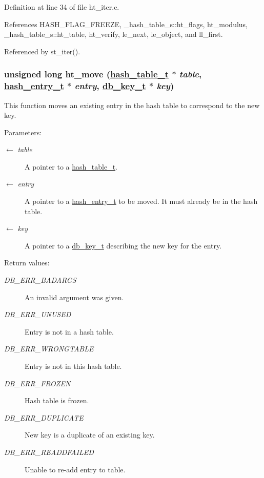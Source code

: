 Definition at line 34 of file ht\_\-iter.c.

References HASH\_\-FLAG\_\-FREEZE, \_\-hash\_\-table\_\-s::ht\_\-flags, ht\_\-modulus, \_\-hash\_\-table\_\-s::ht\_\-table, ht\_\-verify, le\_\-next, le\_\-object, and ll\_\-first.

Referenced by st\_\-iter().\hypertarget{group__dbprim__hash_ga12}{
\subsubsection[ht\_\-move]{\setlength{\rightskip}{0pt plus 5cm}unsigned long ht\_\-move (\hyperlink{struct__hash__table__s}{hash\_\-table\_\-t} $\ast$ {\em table}, \hyperlink{struct__hash__entry__s}{hash\_\-entry\_\-t} $\ast$ {\em entry}, \hyperlink{struct__db__key__s}{db\_\-key\_\-t} $\ast$ {\em key})}}
\label{group__dbprim__hash_ga12}


This function moves an existing entry in the hash table to correspond to the new key.

\begin{Desc}
\item[Parameters:]
\begin{description}
\item[\mbox{$\leftarrow$} {\em table}]A pointer to a \hyperlink{group__dbprim__hash_ga1}{hash\_\-table\_\-t}. \item[\mbox{$\leftarrow$} {\em entry}]A pointer to a \hyperlink{group__dbprim__hash_ga2}{hash\_\-entry\_\-t} to be moved. It must already be in the hash table. \item[\mbox{$\leftarrow$} {\em key}]A pointer to a \hyperlink{group__dbprim_ga0}{db\_\-key\_\-t} describing the new key for the entry.\end{description}
\end{Desc}
\begin{Desc}
\item[Return values:]
\begin{description}
\item[{\em DB\_\-ERR\_\-BADARGS}]An invalid argument was given. \item[{\em DB\_\-ERR\_\-UNUSED}]Entry is not in a hash table. \item[{\em DB\_\-ERR\_\-WRONGTABLE}]Entry is not in this hash table. \item[{\em DB\_\-ERR\_\-FROZEN}]Hash table is frozen. \item[{\em DB\_\-ERR\_\-DUPLICATE}]New key is a duplicate of an existing key. \item[{\em DB\_\-ERR\_\-READDFAILED}]Unable to re-add entry to table.\end{description}
\end{Desc}


